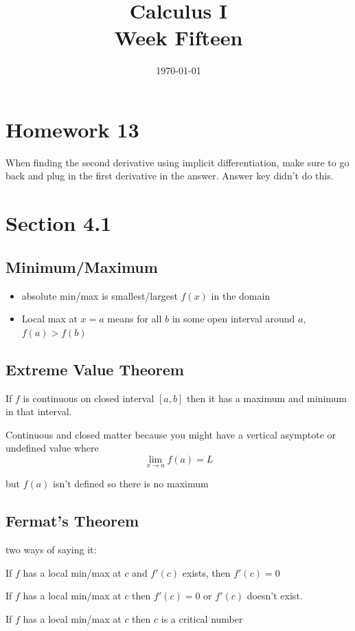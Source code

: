 \documentclass[letterpaper, landscape]{exam}
\author{}
\date{\today}
\title{Calculus I \\ Week Fifteen}
\begin{document}
  \maketitle
  \tableofcontents
  \section{Homework 13} %
  \label{sec:Homework 13}

  When finding the second derivative using implicit differentiation, make sure to go back and plug
  in the first derivative in the answer. Answer key didn't do this.
  
  \section{Section 4.1} %
  
  \subsection{Minimum/Maximum} %

  \begin{itemize}
    \item absolute min/max is smallest/largest $f(x)$ in the domain
    \item Local max at $x = a$ means for all $b$ in some open interval around $a$, $f(a) > f(b)$
  \end{itemize}

  \subsection{Extreme Value Theorem} %
  
  If $f$ is continuous on closed interval $[a, b]$ then it has a maximum and minimum in that
  interval.

  Continuous and closed matter because you might have a vertical asymptote or undefined value where
  \[
    \lim_{x \to a} f(a) = L
  \]

  but $f(a)$ isn't defined so there is no maximum
  
  \subsection{Fermat's Theorem} %
  
  two ways of saying it:
  \begin{itemize*}
    \item If $f$ has a local min/max at $c$ and $f'(c)$ exists, then $f'(c) = 0$ 
    \item If $f$ has a local min/max at $c$ then $f'(c) = 0$ or $f'(c)$ doesn't exist.
    \item If $f$ has a local min/max at $c$ then $c$ is a critical number
  \end{itemize*}
\end{document}
